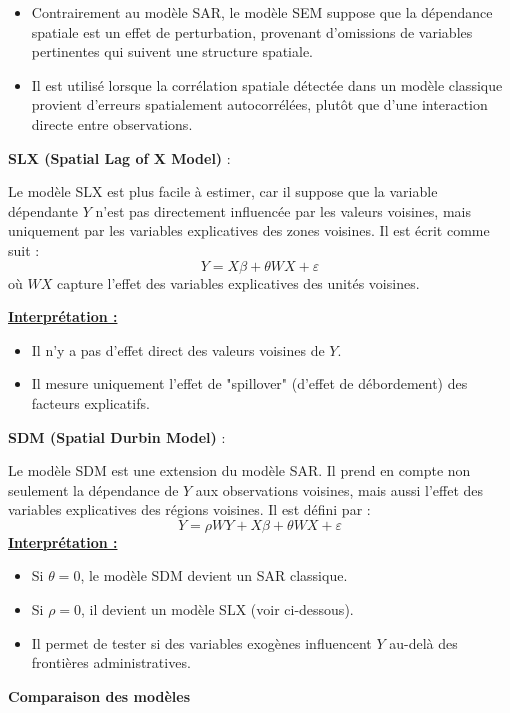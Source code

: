 \documentclass[
]{article}
\begin{document}
\begin{itemize}
\item Contrairement au modèle SAR, le modèle SEM suppose que la dépendance spatiale est un effet de perturbation, provenant d’omissions de variables pertinentes qui suivent une structure spatiale.
\item Il est utilisé lorsque la corrélation spatiale détectée dans un modèle classique provient d’erreurs spatialement autocorrélées, plutôt que d’une interaction directe entre observations.
\end{itemize}

\textbf{SLX (Spatial Lag of X Model)} :

Le modèle SLX est plus facile à estimer, car il suppose que la variable
dépendante \(Y\) n'est pas directement influencée par les valeurs
voisines, mais uniquement par les variables explicatives des zones
voisines. Il est écrit comme suit : \[
Y = X \beta + \theta W X + \varepsilon
\] où \(W X\) capture l'effet des variables explicatives des unités
voisines.

\underline{\textbf{Interprétation :}}

\begin{itemize}
\item Il n’y a pas d’effet direct des valeurs voisines de \( Y \).
\item Il mesure uniquement l'effet de "spillover" (d'effet de débordement) des facteurs explicatifs.
\end{itemize}

\textbf{SDM (Spatial Durbin Model)} :

Le modèle SDM est une extension du modèle SAR. Il prend en compte non
seulement la dépendance de \(Y\) aux observations voisines, mais aussi
l'effet des variables explicatives des régions voisines. Il est défini
par : \[
Y = \rho W Y + X \beta + \theta W X + \varepsilon
\] \underline{\textbf{Interprétation :}}

\begin{itemize}
\item Si \( \theta = 0 \), le modèle SDM devient un SAR classique.
\item Si \( \rho = 0 \), il devient un modèle SLX (voir ci-dessous).
\item Il permet de tester si des variables exogènes influencent \( Y \) au-delà des frontières administratives.
\end{itemize}

\textbf{Comparaison des modèles}
\end{document}
